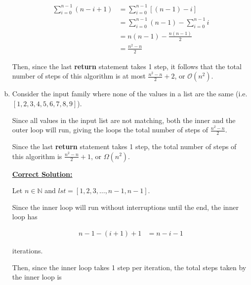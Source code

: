 \documentclass[12pt]{article}
\begin{document}
\begin{enumerate}[a.]
\begin{mdframed}
    \begin{align}
        \sum\limits_{i=0}^{n-1} (n - i + 1) &= \sum\limits_{i=0}^{n-1} \left[ (n-1) - i \right]\\
        &= \sum\limits_{i=0}^{n-1} (n-1) - \sum\limits_{i=0}^{n-1} i\\
        &= n(n-1) - \frac{n(n-1)}{2}\\
        &= \frac{n^2-n}{2}
    \end{align}

    \bigskip

    Then, since the last \textbf{return} statement takes 1 step, it follows
    that the total number of steps of this algorithm is at most
    $\frac{n^2-n}{2} + 2$, or $\mathcal{O}(n^2)$.

    \end{mdframed}

    \item

    Consider the input family where none of the values in a list are the same
    (i.e. $[1,2,3,4,5,6,7,8,9]$).

    \bigskip

    Since all values in the input list are not matching, both the inner and
    the outer loop will run, giving the loops the total number of steps
    of $\frac{n^2-n}{2}$.

    \bigskip

    Since the last \textbf{return} statement takes 1 step, the total number of
    steps of this algorithm is $\frac{n^2-n}{2} + 1$, or $\Omega(n^2)$.

    \begin{mdframed}

    \bigskip

    \underline{\textbf{Correct Solution:}}

    \bigskip

    Let $n \in \mathbb{N}$ and $lst = [1,2,3,\dots,n-1,n-1]$.

    \bigskip

    Since the inner loop will run without interruptions until the end, the
    inner loop has

    \setcounter{equation}{0}
    \begin{align}
        n-1-(i+1) + 1 &= n-i-1
    \end{align}

    iterations.

    \bigskip

    Then, since the inner loop takes 1 step per iteration, the total steps
    taken by the inner loop is


\end{mdframed}
\end{enumerate}
\end{document}
